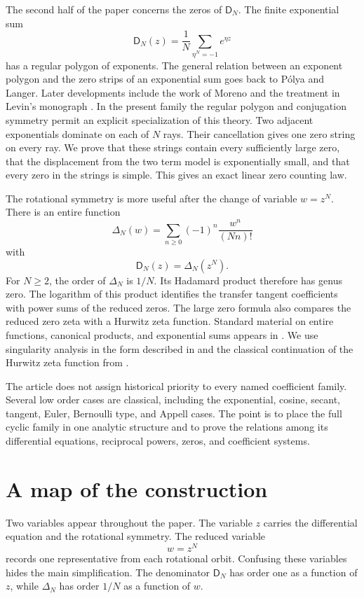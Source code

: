 \documentclass{aomart}
\theoremstyle{definition}
\theoremstyle{remark}
\newcommand{\Dfun}{\mathsf D}
\begin{document}
The second half of the paper concerns the zeros of $\Dfun_N$.  The finite exponential sum
\[
\Dfun_N(z)=\frac1N\sum_{\eta^N=-1}e^{\eta z}
\]
has a regular polygon of exponents.  The general relation between an exponent polygon and the zero strips of an exponential sum goes back to P\'olya and Langer.  Later developments include the work of Moreno and the treatment in Levin's monograph \cite{Polya1920,Langer1931,Moreno1973,Levin1980}.  In the present family the regular polygon and conjugation symmetry permit an explicit specialization of this theory.  Two adjacent exponentials dominate on each of $N$ rays.  Their cancellation gives one zero string on every ray.  We prove that these strings contain every sufficiently large zero, that the displacement from the two term model is exponentially small, and that every zero in the strings is simple.  This gives an exact linear zero counting law.

The rotational symmetry is more useful after the change of variable $w=z^N$.  There is an entire function
\[
\Delta_N(w)=\sum_{n\geq 0}(-1)^n\frac{w^n}{(Nn)!}
\]
with
\[
\Dfun_N(z)=\Delta_N(z^N).
\]
For $N\geq2$, the order of $\Delta_N$ is $1/N$.  Its Hadamard product therefore has genus zero.  The logarithm of this product identifies the transfer tangent coefficients with power sums of the reduced zeros.  The large zero formula also compares the reduced zero zeta with a Hurwitz zeta function.  Standard material on entire functions, canonical products, and exponential sums appears in \cite{Boas1954,Levin1980,Titchmarsh1939}.  We use singularity analysis in the form described in \cite{FlajoletSedgewick2009} and the classical continuation of the Hurwitz zeta function from \cite{Apostol1976}.

The article does not assign historical priority to every named coefficient family.  Several low order cases are classical, including the exponential, cosine, secant, tangent, Euler, Bernoulli type, and Appell cases.  The point is to place the full cyclic family in one analytic structure and to prove the relations among its differential equations, reciprocal powers, zeros, and coefficient systems.



\section{A map of the construction}\label{sec:map}

Two variables appear throughout the paper.  The variable $z$ carries the differential equation and the rotational symmetry.  The reduced variable
\[
w=z^N
\]
records one representative from each rotational orbit.  Confusing these variables hides the main simplification.  The denominator $\Dfun_N$ has order one as a function of $z$, while $\Delta_N$ has order $1/N$ as a function of $w$.
\end{document}
